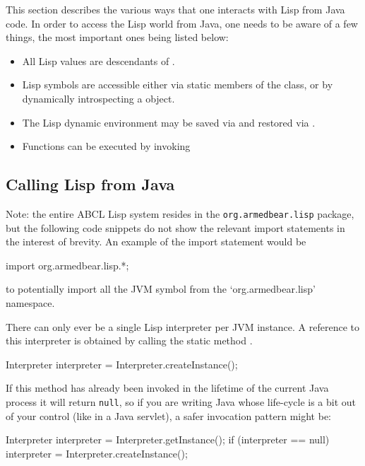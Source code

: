 \documentclass[10pt]{book}
\begin{document}
This section describes the various ways that one interacts with Lisp
from Java code.  In order to access the Lisp world from Java, one needs
to be aware of a few things, the most important ones being listed below:

\begin{itemize}
\item All Lisp values are descendants of .
\item Lisp symbols are accessible either via static members of the
   class, or by dynamically introspecting a 
  object.
\item The Lisp dynamic environment may be saved via
   and restored via
  .
\item Functions can be executed by invoking 
\end{itemize}

\subsection{Calling Lisp from Java}
\label{sec:calling-lisp-from-java}

Note: the entire ABCL Lisp system resides in the
\texttt{org.armedbear.lisp} package, but the following code snippets do
not show the relevant import statements in the interest of brevity.  An
example of the import statement would be
\begin{listing-java}
  import org.armedbear.lisp.*;
\end{listing-java}
to potentially import all the JVM symbol from the `org.armedbear.lisp'
namespace.

There can only ever be a single Lisp interpreter per JVM instance.  A
reference to this interpreter is obtained by calling the static method
.

\begin{listing-java}
  Interpreter interpreter = Interpreter.createInstance();
\end{listing-java}

If this method has already been invoked in the lifetime of the current
Java process it will return \texttt{null}, so if you are writing Java
whose life-cycle is a bit out of your control (like in a Java servlet),
a safer invocation pattern might be:

\begin{listing-java}
  Interpreter interpreter = Interpreter.getInstance();
  if (interpreter == null) {
    interpreter = Interpreter.createInstance();
  }
\end{listing-java}
\end{document}
